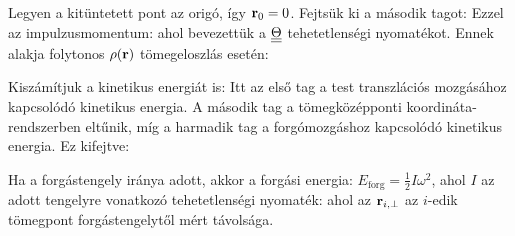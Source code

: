    Legyen a kitüntetett pont az origó, így $\mathbf{r}_0=0$. Fejtsük ki a második tagot:
   Ezzel az impulzusmomentum:
   ahol bevezettük a $\underline{\underline{\Theta}}$ tehetetlenségi nyomatékot. Ennek alakja folytonos $\rho(\mathbf{r})$ tömegeloszlás esetén:
   
   Kiszámítjuk a kinetikus energiát is:
   Itt az első tag a test transzlációs mozgásához kapcsolódó kinetikus energia. A második tag a tömegközépponti koordináta-rendszerben eltűnik, míg a harmadik tag a forgómozgáshoz kapcsolódó kinetikus energia. Ez kifejtve:
   
   Ha a forgástengely iránya adott, akkor a forgási energia: $E_\text{forg}=\frac 12 I\omega^2$, ahol $I$ az adott tengelyre vonatkozó tehetetlenségi nyomaték:
   ahol az $\mathbf{r}_{i,\perp}$ az $i$-edik tömegpont forgástengelytől mért távolsága. 
   
